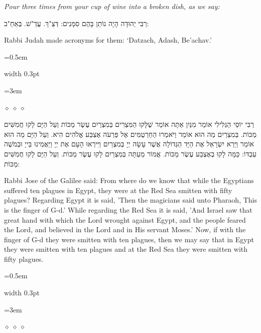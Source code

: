 \documentclass[11pt, openany]{book}
\newcommand{\instruction}[1]{%
  \par\vspace{3pt}
  \begin{tcolorbox}[
    enhanced,
    breakable,
    colback=sederlight,
    colframe=sederlight,
    boxrule=0pt,
    left=10pt,
    right=6pt,
    top=4pt,
    bottom=4pt,
    borderline west={2pt}{0pt}{sederwine!60},
    arc=0pt,
    outer arc=0pt,
  ]
    {\small\itshape\textcolor{sederwine}{#1}}
  \end{tcolorbox}
  \par\vspace{2pt}
}
\newlength{\bidiHebWidth}
\newlength{\bidiEngWidth}
\newenvironment{bilingual}{%
  \par\vspace{4pt}%
}{%
  \noindent
  \begin{minipage}[t]{\bidiEngWidth}
    \setstretch{1.4}\emergencystretch=0.5em\normalsize
    \usebox{\bidiEngBox}
  \end{minipage}%
  \hfill
  {\color{sedergold}\vrule width 0.3pt}%
  \hfill
  \begin{minipage}[t]{\bidiHebWidth}
    \begingroup\hebrewfont\TeXXeTstate=1\beginR
    \large\setstretch{1.4}\emergencystretch=3em\tolerance=9999\parindent=0pt\relax
    \usebox{\bidiHebBox}
    \endR\endgroup
  \end{minipage}%
  \par\vspace{2pt}%
}
\newenvironment{hebrewcol}{%
  \begin{lrbox}{\bidiHebBox}\begin{minipage}{\bidiHebWidth}%
}{%
  \end{minipage}\end{lrbox}%
}
\newenvironment{englishcol}{%
  \begin{lrbox}{\bidiEngBox}\begin{minipage}{\bidiEngWidth}%
}{%
  \end{minipage}\end{lrbox}%
}
\newcommand{\parasep}{%
  \par\vspace{3pt}
  \begin{center}
    \textcolor{sedergold!50}{\tiny$\diamond\;\diamond\;\diamond$}
  \end{center}
  \par\vspace{3pt}
}
\begin{document}
\instruction{Pour three times from your cup of wine into a broken dish, as we say:}

\begin{bilingual}
\begin{hebrewcol}
רַבִּי יְהוּדָה הָיָה נוֹתֵן בָּהֶם סִמָּנִים:
דְּצַ"ךְ. עֲדַ"שׁ. בְּאַחַ"ב:
\end{hebrewcol}
\begin{englishcol}
Rabbi Judah made acronyms for them: `Datzach, Adash, Be'achav.'
\end{englishcol}
\end{bilingual}
\parasep

\begin{bilingual}
\begin{hebrewcol}
רַבִּי יוֹסֵי הַגְּלִילִי אוֹמֵר מִנַּיִן אַתָּה אוֹמֵר שֶׁלָּקוּ הַמִּצְרִים בְּמִצְרַיִם עֶשֶׂר מַכּוֹת וְעַל הַיָּם לָקוּ חֲמִשִּׁים מַכּוֹת. בְּמִצְרַיִם מַה הוּא אוֹמֵר וַיֹּאמְרוּ הַחַרְטֻמִּים אֶל פַּרְעֹה אֶצְבַּע אֱלֹהִים הִיא. וְעַל הַיָּם מַה הוּא אוֹמֵר וַיַּרְא יִשְׂרָאֵל אֶת הַיָּד הַגְּדוֹלָה אֲשֶׁר עָשָׂה יְיָ בְּמִצְרַיִם וַיִּירְאוּ הָעָם אֶת יְיָ וַיַּאֲמִינוּ בַּייָ וּבְמֹשֶׁה עַבְדּוֹ: כַּמָּה לָקוּ בְאֶצְבַּע עֶשֶׂר מַכּוֹת. אֱמוֹר מֵעַתָּה בְּמִצְרַיִם לָקוּ עֶשֶׂר מַכּוֹת. וְעַל הַיָּם לָקוּ חֲמִשִּׁים מַכּוֹת:
\end{hebrewcol}
\begin{englishcol}
Rabbi Jose of the Galilee said: From where  do we know that while the Egyptians suffered ten plagues in Egypt, they were at the Red Sea smitten with fifty plagues? Regarding Egypt it is said, 'Then the magicians said unto Pharaoh, This is the finger of G-d.' While regarding the Red Sea it is said, 'And Israel saw that great hand with which the Lord wrought against Egypt, and the people feared the Lord, and believed in the Lord and in His servant Moses.' Now, if with the finger of G-d they were smitten with ten plagues, then we may say that in Egypt they were smitten with ten plagues and at the Red Sea they were smitten with fifty plagues.
\end{englishcol}
\end{bilingual}
\parasep
\end{document}
